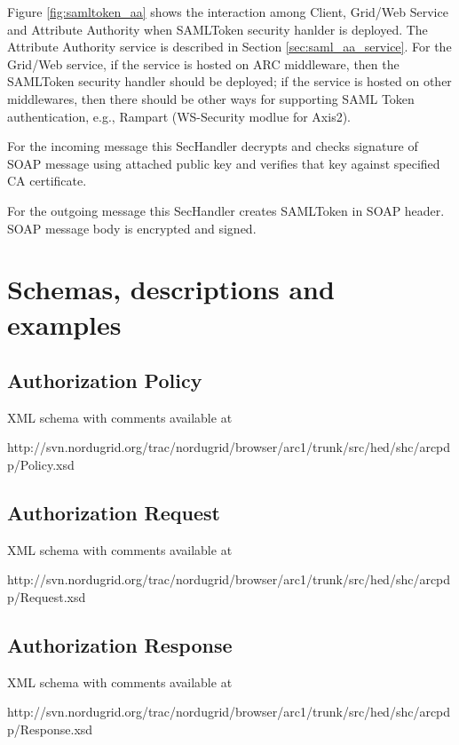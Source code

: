 \documentclass{article}                            %
\begin{document}
Figure \ref{fig:samltoken_aa} shows the interaction among Client, Grid/Web Service and Attribute Authority when SAMLToken security hanlder is deployed. The Attribute Authority service is described in Section \ref{sec:saml_aa_service}. For the Grid/Web service, if the service is hosted on ARC middleware, then the SAMLToken security handler should be deployed; if the service is hosted on other middlewares, then there should be other ways for supporting SAML Token authentication, e.g., Rampart (WS-Security modlue for Axis2).

For the incoming message this SecHandler decrypts and checks signature of SOAP message using attached public key and verifies that key against specified CA certificate.

For the outgoing message this SecHandler creates SAMLToken in SOAP header. SOAP message body is encrypted and signed.




\section{Schemas, descriptions and examples} %
\label{sec:schema_description_example}

\subsection{Authorization Policy} %
\label{subsec:authz_policy}
XML schema with comments available at

http://svn.nordugrid.org/trac/nordugrid/browser/arc1/trunk/src/hed/shc/arcpdp/Policy.xsd

\subsection{Authorization Request} %
\label{subsec:authz_request}
XML schema with comments available at 

http://svn.nordugrid.org/trac/nordugrid/browser/arc1/trunk/src/hed/shc/arcpdp/Request.xsd


\subsection{Authorization Response} %
\label{subsec:authz_response}
XML schema with comments available at 

http://svn.nordugrid.org/trac/nordugrid/browser/arc1/trunk/src/hed/shc/arcpdp/Response.xsd
\end{document}
